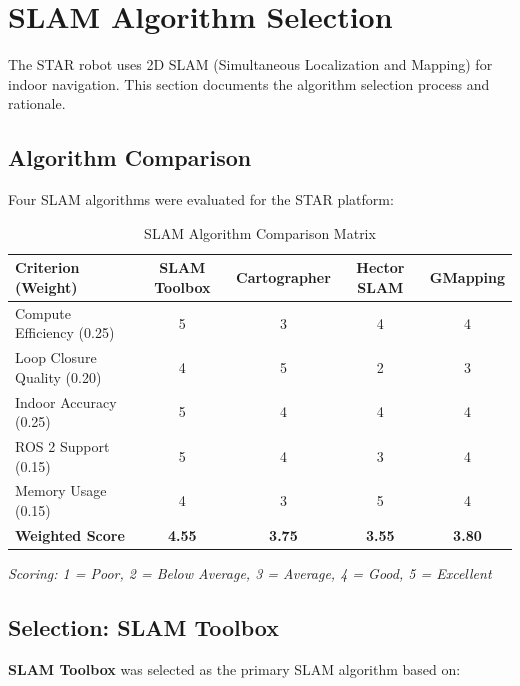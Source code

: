 \section{SLAM Algorithm Selection}

The STAR robot uses 2D SLAM (Simultaneous Localization and Mapping) for indoor navigation. This section documents the algorithm selection process and rationale.

\subsection{Algorithm Comparison}

Four SLAM algorithms were evaluated for the STAR platform:

\begin{table}[H]
\centering
\caption{SLAM Algorithm Comparison Matrix}
\begin{tabular}{|l|c|c|c|c|}
\hline
\textbf{Criterion (Weight)} & \textbf{SLAM Toolbox} & \textbf{Cartographer} & \textbf{Hector SLAM} & \textbf{GMapping} \\
\hline
Compute Efficiency (0.25) & 5 & 3 & 4 & 4 \\
\hline
Loop Closure Quality (0.20) & 4 & 5 & 2 & 3 \\
\hline
Indoor Accuracy (0.25) & 5 & 4 & 4 & 4 \\
\hline
ROS 2 Support (0.15) & 5 & 4 & 3 & 4 \\
\hline
Memory Usage (0.15) & 4 & 3 & 5 & 4 \\
\hline
\textbf{Weighted Score} & \textbf{4.55} & \textbf{3.75} & \textbf{3.55} & \textbf{3.80} \\
\hline
\end{tabular}
\end{table}

\textit{Scoring: 1 = Poor, 2 = Below Average, 3 = Average, 4 = Good, 5 = Excellent}

\subsection{Selection: SLAM Toolbox}

\textbf{SLAM Toolbox} was selected as the primary SLAM algorithm based on:

